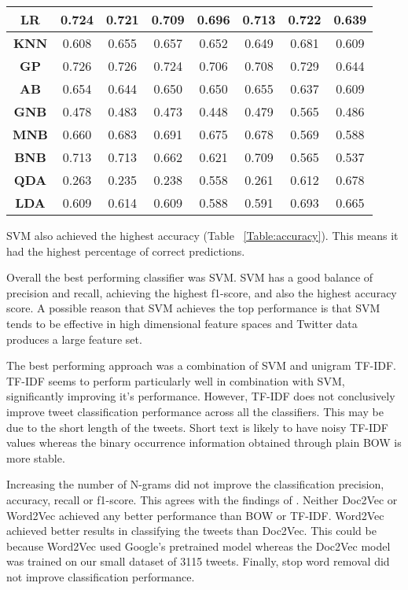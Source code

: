 \begin{table}[h!]
{\begin{tabular}{cccccccc}
\textbf{LR} & 0.724 & 0.721 & 0.709 & 0.696 & 0.713 & 0.722 & 0.639  \\ \hline
\rowcolor[HTML]{EFEFEF} 
\textbf{KNN} & 0.608 & 0.655 & 0.657 & 0.652 & 0.649 & 0.681 & 0.609  \\ \hline
\textbf{GP} & 0.726 & 0.726 & 0.724 & 0.706 & 0.708 & 0.729 & 0.644  \\ \hline
\rowcolor[HTML]{EFEFEF} 
\textbf{AB} & 0.654 & 0.644 & 0.650 & 0.650 & 0.655 & 0.637 & 0.609  \\ \hline
\textbf{GNB} & 0.478 & 0.483 & 0.473 & 0.448 & 0.479 & 0.565 & 0.486  \\ \hline
\rowcolor[HTML]{EFEFEF} 
\textbf{MNB} & \multicolumn{1}{c}{\cellcolor[HTML]{EFEFEF}0.660} & 0.683 & 0.691 & 0.675 & 0.678 & 0.569 & 0.588  \\ \hline
\rowcolor[HTML]{FFFFFF} 
\textbf{BNB} & 0.713 & 0.713 & 0.662 & 0.621 & 0.709 & 0.565 & 0.537  \\ \hline
\rowcolor[HTML]{EFEFEF} 
\textbf{QDA} & 0.263 & 0.235 & 0.238 & 0.558 & 0.261 & 0.612 & 0.678  \\ \hline
\rowcolor[HTML]{FFFFFF} 
\textbf{LDA} & 0.609 & 0.614 & 0.609 & 0.588 & 0.591 & 0.693 & 0.665  \\ \hline
\end{tabular}}
\end{table}

SVM also achieved the highest accuracy (Table ~\ref{Table:accuracy}). This means it had the highest percentage of correct predictions.

Overall the best performing classifier was SVM. SVM has a good balance of precision and recall, achieving the highest f1-score, and also the highest accuracy score. A possible reason that SVM achieves the top performance is that SVM tends to be effective in high dimensional feature spaces and Twitter data produces a large feature set.

The best performing approach was a combination of SVM and unigram TF-IDF. TF-IDF seems to perform particularly well in combination with SVM, significantly improving it's performance. However, TF-IDF does not conclusively improve tweet classification performance across all the classifiers. This may be due to the short length of the tweets. Short text is likely to have noisy TF-IDF values whereas the binary occurrence information obtained through plain BOW is more stable.

Increasing the number of N-grams did not improve the classification precision, accuracy, recall or f1-score. This agrees with the findings of \cite{Berm2010}. Neither Doc2Vec or Word2Vec achieved any better performance than BOW or TF-IDF. Word2Vec achieved better results in classifying the tweets than Doc2Vec. This could be because Word2Vec used Google's pretrained model whereas the Doc2Vec model was trained on our small dataset of 3115 tweets. Finally, stop word removal did not improve classification performance.

